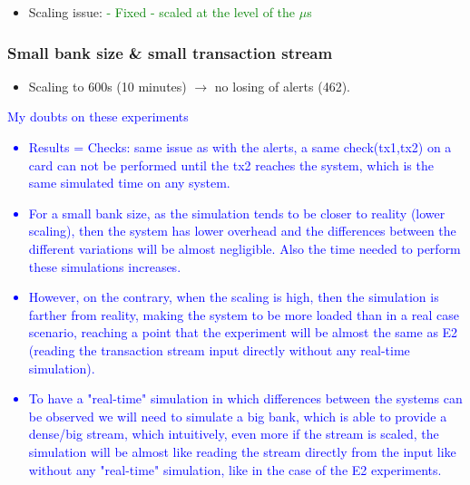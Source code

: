 \documentclass[12pt,a4paper]{article}
\begin{document}
\begin{itemize}
    \item Scaling issue: \textcolor{green}{- Fixed - scaled at the level of the $\mu$s}
\end{itemize}

\subsubsection{Small bank size \& small transaction stream}

\begin{itemize}
    \item Scaling to 600s (10 minutes) $\rightarrow$ no losing of alerts (462).
\end{itemize}

\textcolor{blue}{
My doubts on these experiments
\begin{itemize}
    \item Results = Checks: same issue as with the alerts, a same check(tx1,tx2) on a card can not be performed until the tx2 reaches the system, which is the same simulated time on any system.
    \item For a small bank size, as the simulation tends to be closer to reality (lower scaling), 
    then the system has lower overhead and the differences between the different variations will be almost negligible. Also the time needed to perform these simulations increases.
    \item However, on the contrary, when the scaling is high, then the simulation is farther from reality, making the system to be more loaded than in a real case scenario, reaching a point that the experiment will be almost the same as E2 (reading the transaction stream input directly without any real-time simulation).
    \item To have a "real-time" simulation in which differences between the systems can be observed we will need to simulate a big bank, which is able to provide a dense/big stream, which intuitively, even more if the stream is scaled, the simulation will be almost like reading the stream directly from the input like without any "real-time" simulation, like in the case of the E2 experiments. 
\end{itemize}
}
\end{document}
